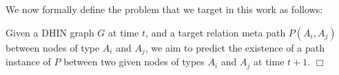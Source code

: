 We now formally define the problem that we target in this work as follows:

\begin{definition}\label{problemdef}
Given a DHIN graph $G$ at time $t$, and a target relation meta path $P(A_i,A_j)$ between nodes of type $A_i$ and $A_j$, we aim to predict the existence of a path instance of $P$ between two given nodes of types $A_i$ and $A_j$ at time $t+1$. $\Box$
 \end{definition}






%
%

